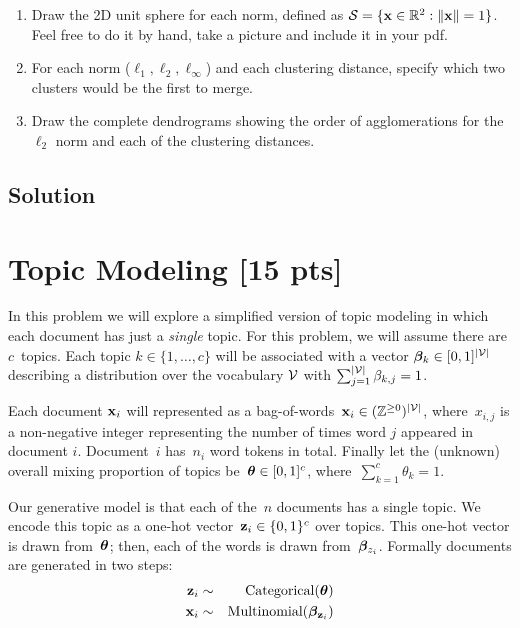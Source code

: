 \documentclass[submit]{harvardml}
\begin{document}
\begin{problem}
  \begin{enumerate}
  \item Draw the 2D unit sphere for each norm,
  defined as $\mathcal{S} = \{\mathbf{x} \in \mathbb{R}^2: \|\mathbf{x}\| = 1 \}$. Feel free to do
  it by hand, take a picture and include it in your pdf.
\item  For each norm ($\ell_1, \ell_2, \ell_\infty$) and each clustering distance, specify which two clusters would
  be the first to merge.
\item Draw the complete dendrograms showing the order of agglomerations for the $\ell_2$ norm and each of the clustering distances.
  \end{enumerate}


\end{problem}

\subsection*{Solution}

\newpage 
\section*{Topic Modeling [15 pts]}


In this problem we will explore a simplified version of topic
modeling in which each document has just a \textit{single} topic.
For this problem, we will assume there are $c$~topics. Each topic $k \in \{1, \ldots, c\}$ will be
associated with a vector $\boldsymbol{\beta}_k \in [0,1]^{|\mathcal{V}|}$ describing a
distribution over the vocabulary $\mathcal{V}$ with
${\sum_{j=1}^{|\mathcal{V}|} \beta_{k,j}=1}$.

Each document $\mathbf{x}_i$ will represented as a
bag-of-words~$\mathbf{x}_{i} \in (\mathbb{Z}^{\geq 0})^{|\mathcal{V}|}$, where~$x_{i,j}$ is a
non-negative integer representing the number of times word $j$ appeared in document $i$.  Document~$i$ has~$n_i$
word tokens in total. Finally let the (unknown) overall mixing
proportion of topics be~$\boldsymbol{\theta} \in [0,1]^c$,
where~${\sum_{k=1}^c \theta_k=1}$.

Our generative model is that each of the~$n$ documents has a single
topic. We encode this topic as a one-hot
vector~${\mathbf{z}_i \in \{0,1\}^c}$ over topics. This one-hot vector is
drawn from~$\boldsymbol{\theta}$; then, each of the words is drawn
from~$\boldsymbol{\beta}_{z_i}$. Formally documents are generated in two steps:
\begin{eqnarray*}
 \mathbf{z}_i &\sim& \text{Categorical}(\boldsymbol{\theta}) \\
 \mathbf{x}_i &\sim& \text{Multinomial}(\boldsymbol{\beta}_{\mathbf{z}_i})   
\end{eqnarray*}
\end{document}
